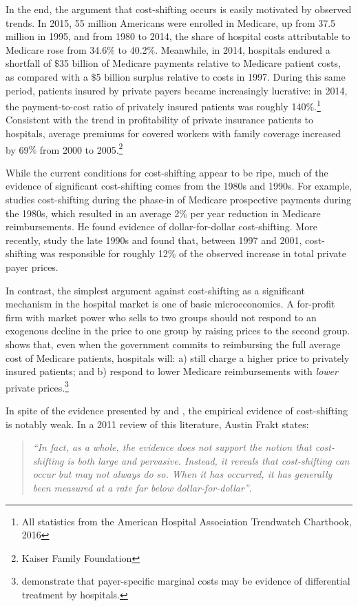 \documentclass[12pt]{article}
\begin{document}
In the end, the argument that cost-shifting occurs is easily motivated by observed trends.  In 2015, 55 million Americans were enrolled in Medicare, up from 37.5 million in 1995, and from 1980 to 2014, the share of hospital costs attributable to Medicare rose from 34.6$\%$ to 40.2$\%$.  Meanwhile, in 2014, hospitals endured a shortfall of $\$$35 billion of Medicare payments relative to Medicare patient costs, as compared with a $\$$5 billion surplus relative to costs in 1997.  During this same period, patients insured by private payers became increasingly lucrative: in 2014, the payment-to-cost ratio of privately insured patients was roughly 140$\%$.\footnote{All statistics from the American Hospital Association Trendwatch Chartbook, 2016} Consistent with the trend in profitability of private insurance patients to hospitals, average premiums for covered workers with family coverage increased by 69$\%$ from 2000 to 2005.\footnote{Kaiser Family Foundation}

While the current conditions for cost-shifting appear to be ripe, much of the evidence of significant cost-shifting comes from the 1980s and 1990s.  For example, \cite{cutler1998costshift} studies cost-shifting during the phase-in of Medicare prospective payments during the 1980s, which resulted in an average 2$\%$ per year reduction in Medicare reimbursements.  He found evidence of dollar-for-dollar cost-shifting.  More recently, \cite{zwanziger2006} study the late 1990s and found that, between 1997 and 2001, cost-shifting was responsible for roughly 12$\%$ of the observed increase in total private payer prices.

In contrast, the simplest argument against cost-shifting as a significant mechanism in the hospital market is one of basic microeconomics.  A for-profit firm with market power who sells to two groups should not respond to an exogenous decline in the price to one group by raising prices to the second group.  \cite{hay1983} shows that, even when the government commits to reimbursing the full average cost of Medicare patients, hospitals will: a) still charge a higher price to privately insured patients; and b) respond to lower Medicare reimbursements with \textit{lower} private prices.\footnote{\cite{dor1996} demonstrate that payer-specific marginal costs may be evidence of differential treatment by hospitals.}

In spite of the evidence presented by \cite{cutler1998costshift} and \cite{zwanziger2006}, the empirical evidence of cost-shifting is notably weak.  In a 2011 review of this literature, Austin Frakt states:
\begin{quote}
\textit{``In fact, as a whole, the
evidence does not support the notion that cost-shifting is both large and
pervasive. Instead, it reveals that cost-shifting can occur but may not
always do so. When it has occurred, it has generally been measured at a
rate far below dollar-for-dollar''}.
\end{quote}
\end{document}
